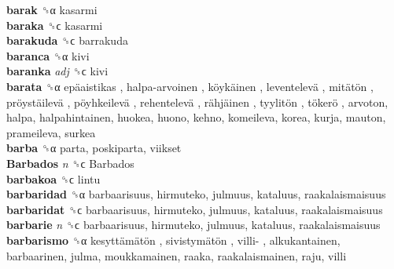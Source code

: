 \textbf{barak} ␝α  kasarmi  \\
\textbf{baraka} ␝ϲ  kasarmi  \\
\textbf{barakuda} ␝ϲ  barrakuda  \\
\textbf{baranca} ␝α  kivi  \\
\textbf{baranka} \emph{adj}  ␝ϲ  kivi  \\
\textbf{barata} ␝α   epäaistikas ,  halpa-arvoinen ,  köykäinen ,  leventelevä ,  mitätön ,  pröystäilevä ,  pöyhkeilevä ,  rehentelevä ,  rähjäinen ,  tyylitön ,  tökerö , arvoton, halpa, halpahintainen, huokea, huono, kehno, komeileva, korea, kurja, mauton, prameileva, surkea  \\
\textbf{barba} ␝α  parta, poskiparta, viikset  \\
\textbf{Barbados} \emph{n}  ␝ϲ   Barbados   \\
\textbf{barbakoa} ␝ϲ  lintu  \\
\textbf{barbaridad} ␝α  barbaarisuus, hirmuteko, julmuus, kataluus, raakalaismaisuus  \\
\textbf{barbaridat} ␝ϲ  barbaarisuus, hirmuteko, julmuus, kataluus, raakalaismaisuus  \\
\textbf{barbarie} \emph{n}  ␝ϲ  barbaarisuus, hirmuteko, julmuus, kataluus, raakalaismaisuus  \\
\textbf{barbarismo} ␝α   kesyttämätön ,  sivistymätön ,  villi- , alkukantainen, barbaarinen, julma, moukkamainen, raaka, raakalaismainen, raju, villi  \\
